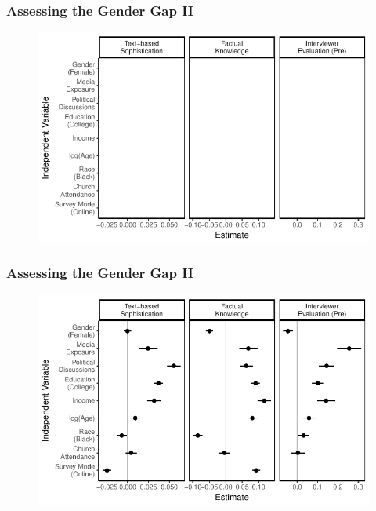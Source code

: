 \documentclass{beamer}
\begin{document}
\begin{frame} %
\frametitle{Assessing the Gender Gap II}
  \begin{figure}
  \includegraphics{../fig/determinants_empty.pdf}
  \end{figure}
\end{frame}
\begin{frame} %
\frametitle{Assessing the Gender Gap II}
  \begin{figure}
  \includegraphics{../fig/determinants_pres.pdf}
  \end{figure}
\end{frame}

\end{document}
